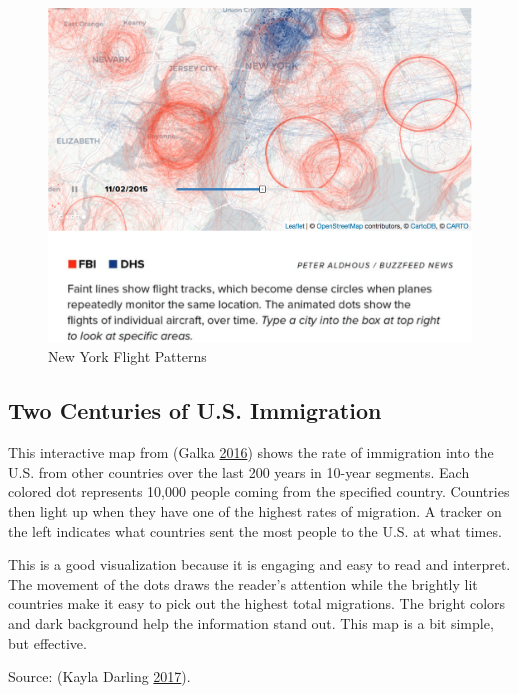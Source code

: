 \documentclass[]{book}
\begin{document}
\begin{figure}
\centering
\includegraphics{images/NYCflights.png}
\caption{New York Flight Patterns}
\end{figure}

\hypertarget{two-centuries-of-u.s.-immigration}{%
\subsection{Two Centuries of U.S. Immigration}\label{two-centuries-of-u.s.-immigration}}

This interactive map from (Galka \protect\hyperlink{ref-immigration}{2016}) shows the rate of immigration into the U.S. from other countries over the last 200 years in 10-year segments. Each colored dot represents 10,000 people coming from the specified country. Countries then light up when they have one of the highest rates of migration. A tracker on the left indicates what countries sent the most people to the U.S. at what times.

This is a good visualization because it is engaging and easy to read and interpret. The movement of the dots draws the reader's attention while the brightly lit countries make it easy to pick out the highest total migrations. The bright colors and dark background help the information stand out. This map is a bit simple, but effective.

Source: (Kayla Darling \protect\hyperlink{ref-cool_data}{2017}).
\end{document}

